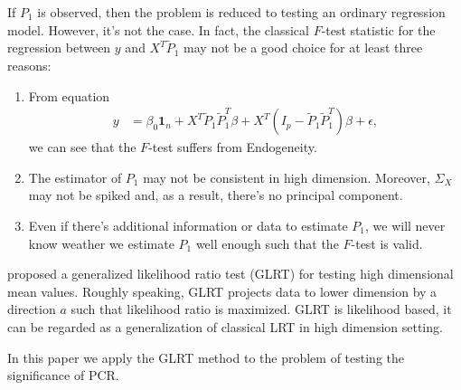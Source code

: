 \documentclass[review]{elsarticle}
\theoremstyle{plain}
\theoremstyle{definition}
\theoremstyle{remark}
\begin{document}
If $P_1$ is observed, then the problem is reduced to testing an ordinary regression model. However, it's not the case. In fact, the classical $F$-test statistic for the regression between $y$  and  $X^T \tilde{P}_1$ may not be a good choice for at least three reasons:
\begin{enumerate}
    \item
From equation
\begin{equation}
    \begin{aligned}
        y&=\beta_0 \textbf{1}_n+X^T \tilde{P}_1\tilde{P}_1^T\beta+X^T (I_p -\tilde{P}_1 \tilde{P}_1^T)\beta+\epsilon,
    \end{aligned}
\end{equation}
we can see that the $F$-test suffers from Endogeneity.
\item
The estimator of $P_1$ may not be consistent in high dimension. Moreover, $\Sigma_X$ may not be spiked and, as a result, there's no principal component.
\item
Even if there's additional information or data to estimate $P_1$, we will never know weather we estimate $P_1$ well enough such that the $F$-test is valid.%
\end{enumerate}



\cite{Zhao2016A} proposed a generalized likelihood ratio test (GLRT) for testing high dimensional mean values.
Roughly speaking, GLRT projects data to lower dimension by a direction $a$ such that likelihood ratio is maximized. GLRT is likelihood based, it can be regarded as a generalization of classical LRT in high dimension setting.

In this paper we apply the GLRT method to the problem of testing the significance of PCR.\
\end{document}
